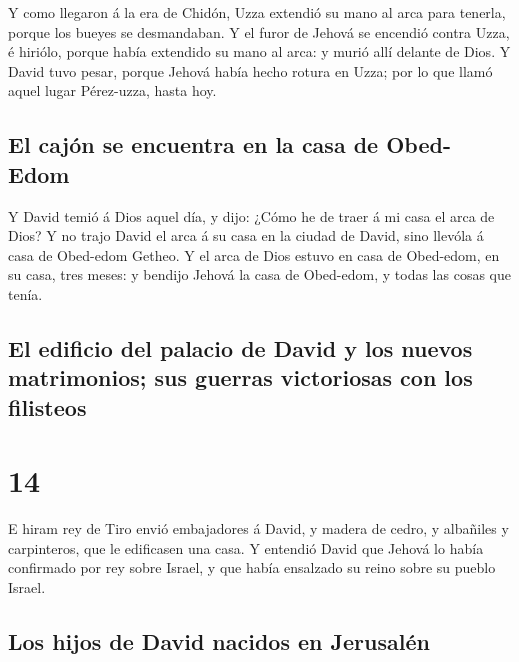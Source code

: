  Y como llegaron á la era de Chidón, Uzza extendió su mano
al arca para tenerla, porque los bueyes se desmandaban.  Y
el furor de Jehová se encendió contra Uzza, é hiriólo, porque había
extendido su mano al arca: y murió allí delante de Dios.  Y
David tuvo pesar, porque Jehová había hecho rotura en Uzza; por lo que
llamó aquel lugar Pérez-uzza, hasta hoy.

\hypertarget{el-cajuxf3n-se-encuentra-en-la-casa-de-obed-edom}{%
\subsection{El cajón se encuentra en la casa de
Obed-Edom}\label{el-cajuxf3n-se-encuentra-en-la-casa-de-obed-edom}}

 Y David temió á Dios aquel día, y dijo: ¿Cómo he de traer
á mi casa el arca de Dios?  Y no trajo David el arca á su
casa en la ciudad de David, sino llevóla á casa de Obed-edom Getheo.
 Y el arca de Dios estuvo en casa de Obed-edom, en su casa,
tres meses: y bendijo Jehová la casa de Obed-edom, y todas las cosas que
tenía.

\hypertarget{el-edificio-del-palacio-de-david-y-los-nuevos-matrimonios-sus-guerras-victoriosas-con-los-filisteos}{%
\subsection{El edificio del palacio de David y los nuevos matrimonios;
sus guerras victoriosas con los
filisteos}\label{el-edificio-del-palacio-de-david-y-los-nuevos-matrimonios-sus-guerras-victoriosas-con-los-filisteos}}

\hypertarget{section-13}{%
\section{14}\label{section-13}}

 E hiram rey de Tiro envió embajadores á David, y madera de
cedro, y albañiles y carpinteros, que le edificasen una casa.
 Y entendió David que Jehová lo había confirmado por rey
sobre Israel, y que había ensalzado su reino sobre su pueblo Israel.

\hypertarget{los-hijos-de-david-nacidos-en-jerusaluxe9n}{%
\subsection{Los hijos de David nacidos en
Jerusalén}\label{los-hijos-de-david-nacidos-en-jerusaluxe9n}}

